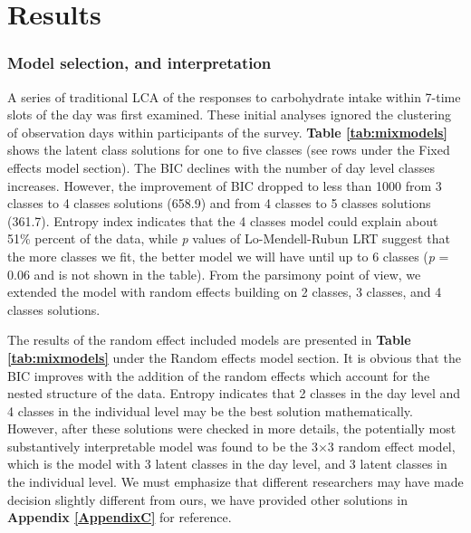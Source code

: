 
\chapter{Results} %

\label{Chapter 3} %


\vspace{-0.7cm}


\subsection{Model selection, and interpretation}\vspace{-0.4cm}

A series of traditional LCA of the responses to carbohydrate intake within 7-time slots of the day was first examined. These initial analyses ignored the clustering of observation days within participants of the survey. \textbf{Table \ref{tab:mixmodels}} shows the latent class solutions for one to five classes (see rows under the Fixed effects model section). The BIC declines with the number of day level classes increases. However, the improvement of BIC dropped to less than 1000 from 3 classes to 4 classes solutions (658.9) and from 4 classes to 5 classes solutions (361.7). Entropy index indicates that the 4 classes model could explain about 51\% percent of the data, while \textit{p} values of Lo-Mendell-Rubun LRT suggest that the more classes we fit, the better model we will have until up to 6 classes (\textit{p} = 0.06 and is not shown in the table). From the parsimony point of view, we extended the model with random effects building on 2 classes, 3 classes, and 4 classes solutions. 

The results of the random effect included models are presented in \textbf{Table \ref{tab:mixmodels}} under the Random effects model section. It is obvious that the BIC improves with the addition of the random effects which account for the nested structure of the data. Entropy indicates that 2 classes in the day level and 4 classes in the individual level may be the best solution mathematically. However, after these solutions were checked in more details, the potentially most substantively interpretable model was found to be the 3$\times$3 random effect model, which is the model with 3 latent classes in the day level, and 3 latent classes in the individual level. We must emphasize that different researchers may have made decision slightly different from ours, we have provided other solutions in \textbf{Appendix \ref{AppendixC}} for reference. 

